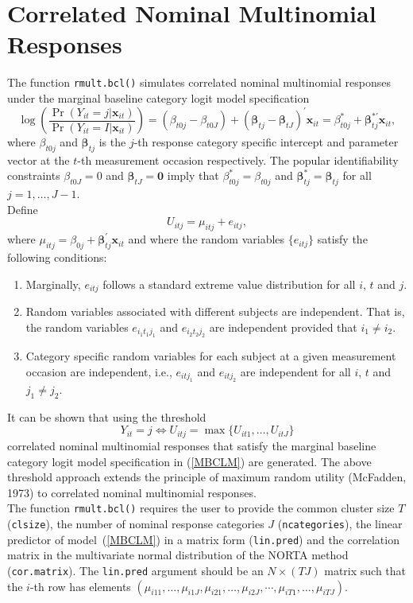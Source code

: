 \documentclass{article}
\begin{document}
\section{Correlated Nominal Multinomial Responses}
The function \texttt{rmult.bcl()} simulates correlated nominal multinomial responses under the marginal baseline category logit model specification
\begin{equation}
\log \left(\frac{\Pr(Y_{it}=j |\mathbf {x}_{it})}{\Pr(Y_{it}=I |\mathbf {x}_{it})}\right)=(\beta_{t0j}-\beta_{t0J})+(\boldsymbol {\beta}_{tj}-\boldsymbol{\beta}_{tJ})^{\prime} \mathbf {x}_{it}=\beta^{\ast}_{t0j}+\boldsymbol{\beta}^{\ast\prime}_{tj}\mathbf {x}_{it},
\label{MBCLM}
\end{equation}
where $\beta_{t0j}$ and $\boldsymbol{\beta}_{tj}$ is the $j$-th response category specific intercept and parameter vector at the $t$-th measurement occasion respectively. The popular identifiability constraints $\beta_{t0J}=0$ and $\boldsymbol{\beta}_{tJ}=\mathbf {0}$ imply that $\beta^{\ast}_{t0j}=\beta_{t0j}$ and $\boldsymbol {\beta}^{\ast}_{tj}=\boldsymbol{\beta}_{tj}$ for all $j=1,\ldots,J-1$.\\
Define 
$$U_{itj}=\mu_{itj}+e_{itj},$$
where $\mu_{itj}=\beta_{0j}+\boldsymbol{\beta}_{tj}^{\prime} \mathbf {x}_{it}$ and where the random variables $\{e_{itj}\}$ satisfy the following conditions: 
\begin{enumerate}
\item Marginally, $e_{itj}$ follows a standard extreme value distribution for all $i$, $t$ and $j$.
\item Random variables associated with different subjects are independent. That is, the random variables $e_{i_1t_1j_1}$ and $e_{i_2t_2j_2}$ are independent provided that $i_1 \neq i_2$.
\item Category specific random variables for each subject at a given measurement occasion are independent, i.e., $e_{itj_1}$ and $e_{itj_2}$ are independent for all $i$, $t$ and $j_1\neq j_2$.
\end{enumerate}
It can be shown that using the threshold
$$Y_{it}=j \Leftrightarrow U_{itj}=\max \{U_{it1},\ldots,U_{itJ}\}$$
correlated nominal multinomial responses that satisfy the marginal baseline category logit model specification in (\ref{MBCLM}) are generated. The above threshold approach extends the principle of maximum random utility (McFadden, 1973) to correlated nominal multinomial responses.\\
\indent The function \texttt{rmult.bcl()} requires the user to provide the common cluster size $T$ (\texttt{clsize}), the number of nominal response categories $J$ (\texttt{ncategories}), the linear predictor of model~(\ref{MBCLM}) in a matrix form (\texttt{lin.pred}) and the correlation matrix in the multivariate normal distribution of the NORTA method (\texttt{cor.matrix}). The \texttt{lin.pred} argument should be an $N \times (TJ)$ matrix such that the $i$-th row has elements $(\mu_{i11},\ldots,\mu_{i1J},\mu_{i21},\ldots,\mu_{i2J},\cdots,\mu_{iT1},\ldots,\mu_{iTJ})$.\\
\end{document}
